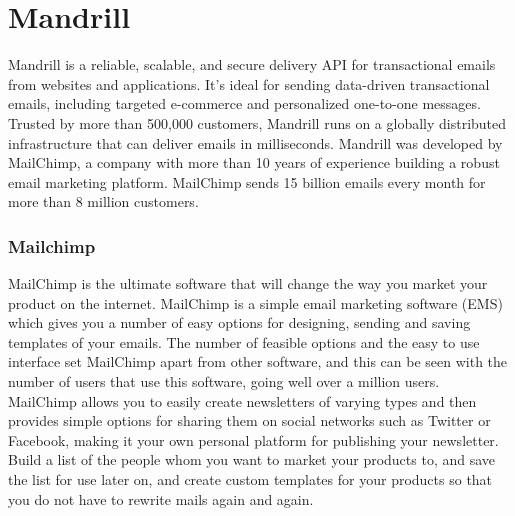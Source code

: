 \section{Mandrill}
\label{sec:USR_mandrill}


Mandrill is a reliable, scalable, and secure delivery API for transactional emails from websites and applications. It's ideal for sending data-driven transactional emails, including targeted e-commerce and personalized one-to-one messages.
Trusted by more than 500,000 customers, Mandrill runs on a globally distributed infrastructure that can deliver emails in milliseconds.
Mandrill was developed by MailChimp, a company with more than 10 years of experience building a robust email marketing platform. MailChimp sends 15 billion emails every month for more than 8 million customers.


\subsubsection{Mailchimp}
\label{subsubsec:USR_mandrill_mailchimp}
MailChimp is the ultimate software that will change the way you market your product on the internet. MailChimp is a simple email marketing software (EMS) which gives you a number of easy options for designing, sending and saving templates of your emails. The number of feasible options and the easy to use interface set MailChimp apart from other software, and this can be seen with the number of users that use this software, going well over a million users.
MailChimp allows you to easily create newsletters of varying types and then provides simple options for sharing them on social networks such as Twitter or Facebook, making it your own personal platform for publishing your newsletter. Build a list of the people whom you want to market your products to, and save the list for use later on, and create custom templates for your products so that you do not have to rewrite mails again and again.

